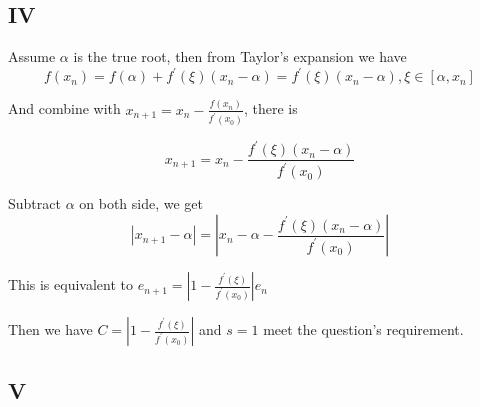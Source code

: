 \documentclass[12]{article}%
\begin{document}
        \subsection{IV}
            Assume $\alpha$ is the true root, then from Taylor's expansion we have
            $$
f(x_n)=f(\alpha)+f^{'}(\xi)(x_n-\alpha)=f^{'}(\xi)(x_n-\alpha),\xi\in [\alpha,x_n]
            $$

            And combine with $x_{n+1}=x_n-\frac{f(x_n)}{f^{'}(x_0)}$, there is 

            $$
x_{n+1}=x_n-\frac{f^{'}(\xi)(x_n-\alpha)}{f^{'}(x_0)}
            $$

            Subtract $\alpha$ on both side, we get
            $$
            |x_{n+1}-\alpha|=|x_n-\alpha-\frac{f^{'}(\xi)(x_n-\alpha)}{f^{'}(x_0)}|
            $$

            This is equivalent to $e_{n+1}=|1-\frac{f^{'}(\xi)}{f^{'}(x_0)}|e_n$

            Then we have $C=|1-\frac{f^{'}(\xi)}{f^{'}(x_0)}|$ and $s=1$ meet the question's requirement.

        \subsection{V}
            
\end{document}
